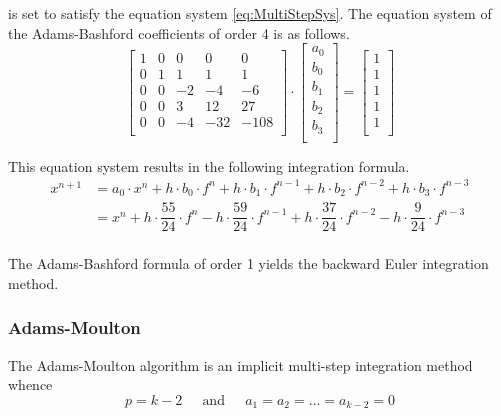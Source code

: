 \documentclass[10pt]{report}
\begin{document}
is set to satisfy the equation system \eqref{eq:MultiStepSys}.  The
equation system of the Adams-Bashford coefficients of order 4 is as
follows.
\begin{equation}
\left[\begin{array}{lrrrr}
1 & 0 &  0 &   0 &    0\\
0 & 1 &  1 &   1 &    1\\
0 & 0 & -2 &  -4 &   -6\\
0 & 0 &  3 &  12 &   27\\
0 & 0 & -4 & -32 & -108\\
\end{array}\right]
\cdot
\begin{bmatrix}
a_0\\
b_0\\
b_1\\
b_2\\
b_3\\
\end{bmatrix}
=
\begin{bmatrix}
1\\
1\\
1\\
1\\
1\\
\end{bmatrix}
\end{equation}

This equation system results in the following integration formula.
\begin{equation}
\begin{split}
x^{n+1} &= a_0\cdot x^{n} + h\cdot b_{0}\cdot f^{n} + h\cdot b_{1}\cdot f^{n-1} + h\cdot b_{2}\cdot f^{n-2} + h\cdot b_{3}\cdot f^{n-3}\\
&= x^{n} + h\cdot \dfrac{55}{24}\cdot f^{n} - h\cdot \dfrac{59}{24}\cdot f^{n-1} + h\cdot \dfrac{37}{24}\cdot f^{n-2} - h\cdot \dfrac{9}{24}\cdot f^{n-3}\\
\end{split}
\end{equation}

The Adams-Bashford formula of order 1 yields the backward Euler
integration method.

\subsubsection{Adams-Moulton}

The Adams-Moulton algorithm is an implicit multi-step integration
method whence
\begin{equation}
p = k - 2
\;\;\;\; \textrm{ and } \;\;\;\;
a_1 = a_2 = \ldots = a_{k-2} = 0
\end{equation}
\end{document}
